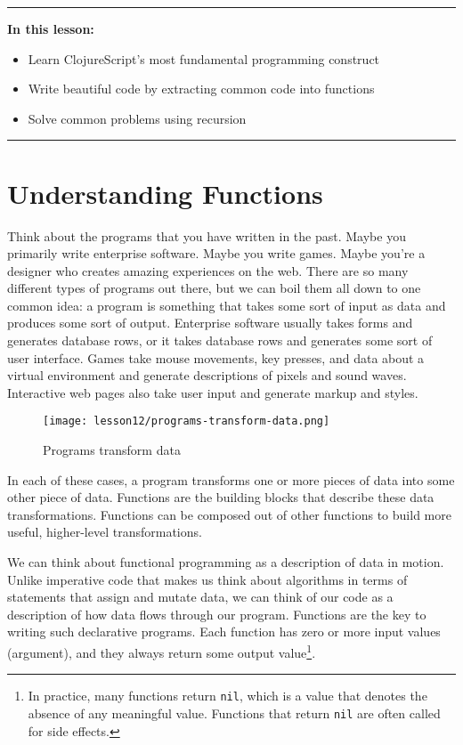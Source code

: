 \documentclass[10pt,twoside,openright]{memoir}
\begin{document}
\begin{center}\rule{0.5\linewidth}{0.5pt}\end{center}

\textbf{In this lesson:}

\begin{itemize}
\tightlist
\item
  Learn ClojureScript's most fundamental programming construct
\item
  Write beautiful code by extracting common code into functions
\item
  Solve common problems using recursion
\end{itemize}

\begin{center}\rule{0.5\linewidth}{0.5pt}\end{center}


\section{Understanding Functions}

Think about the programs that you have written in the past. Maybe you
primarily write enterprise software. Maybe you write games. Maybe you're
a designer who creates amazing experiences on the web. There are so many
different types of programs out there, but we can boil them all down to
one common idea: a program is something that takes some sort of input as
data and produces some sort of output. Enterprise software usually takes
forms and generates database rows, or it takes database rows and
generates some sort of user interface. Games take mouse movements, key
presses, and data about a virtual environment and generate descriptions
of pixels and sound waves. Interactive web pages also take user input
and generate markup and styles.

\begin{figure}[H]
\caption{Programs transform data}
\centering
\texttt{[image: lesson12/programs-transform-data.png]}
\end{figure}

In each of these cases, a program transforms one or more pieces of data
into some other piece of data. Functions are the building blocks that
describe these data transformations. Functions can be composed out of
other functions to build more useful, higher-level transformations.

We can think about functional programming as a description of data in
motion. Unlike imperative code that makes us think about algorithms in
terms of statements that assign and mutate data, we can think of our
code as a description of how data flows through our program. Functions
are the key to writing such declarative programs. Each function has zero
or more input values (argument), and they always return some output
value\footnote{In practice, many functions return \texttt{nil}, which is
  a value that denotes the absence of any meaningful value. Functions
  that return \texttt{nil} are often called for side effects.}.
\end{document}
